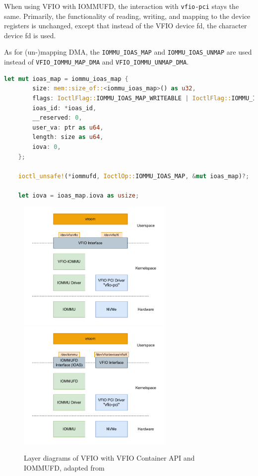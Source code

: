 When using VFIO with IOMMUFD, the interaction with \texttt{vfio-pci} stays the same. Primarily, the functionality of reading, writing, and mapping to the device registers is unchanged, except that instead of the VFIO device fd, the character device fd is used.

As for (un-)mapping DMA, the \texttt{IOMMU\_IOAS\_MAP} and \texttt{IOMMU\_IOAS\_UNMAP} are used instead of \texttt{VFIO\_IOMMU\_MAP\_DMA} and \texttt{VFIO\_IOMMU\_UNMAP\_DMA}.

\begin{minipage}{.95\linewidth}
    \begin{lstlisting}[language=Rust,caption={Mapping memory for DMA with IOMMUFD}, label=lst:mapdmaiommufd]
    let mut ioas_map = iommu_ioas_map {
        size: mem::size_of::<iommu_ioas_map>() as u32,
        flags: IoctlFlag::IOMMU_IOAS_MAP_WRITEABLE | IoctlFlag::IOMMU_IOAS_MAP_READABLE,
        ioas_id: *ioas_id,
        __reserved: 0,
        user_va: ptr as u64,
        length: size as u64,
        iova: 0,
    };

    ioctl_unsafe!(*iommufd, IoctlOp::IOMMU_IOAS_MAP, &mut ioas_map)?; 

    let iova = ioas_map.iova as usize; 
\end{lstlisting}
\end{minipage}

\begin{figure}[H]
    \centering
     {\includegraphics[width=0.67\textwidth]{figures/VFIOLayer.pdf}}
     {\includegraphics[width=0.67\textwidth]{figures/IOMMUFDLayer.pdf}}
    \caption{Layer diagrams of VFIO with VFIO Container API and IOMMUFD, adapted from \cite{dpdkiommufd}}
    \label{fig:layer}
\end{figure}

